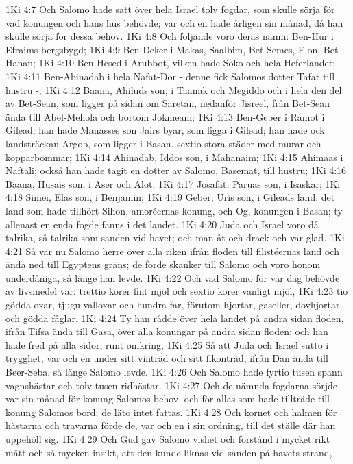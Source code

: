 1Ki 4:7  Och Salomo hade satt över hela Israel tolv fogdar, som skulle sörja för vad konungen och hans hus behövde; var och en hade årligen sin månad, då han skulle sörja för dessa behov.
1Ki 4:8  Och följande voro deras namn: Ben-Hur i Efraims bergsbygd;
1Ki 4:9  Ben-Deker i Makas, Saalbim, Bet-Semes, Elon, Bet-Hanan;
1Ki 4:10  Ben-Hesed i Arubbot, vilken hade Soko och hela Heferlandet;
1Ki 4:11  Ben-Abinadab i hela Nafat-Dor - denne fick Salomos dotter Tafat till hustru -;
1Ki 4:12  Baana, Ahiluds son, i Taanak och Megiddo och i hela den del av Bet-Sean, som ligger på sidan om Saretan, nedanför Jisreel, från Bet-Sean ända till Abel-Mehola och bortom Jokmeam;
1Ki 4:13  Ben-Geber i Ramot i Gilead; han hade Manasses son Jairs byar, som ligga i Gilead; han hade ock landsträckan Argob, som ligger i Basan, sextio stora städer med murar och kopparbommar;
1Ki 4:14  Ahinadab, Iddos son, i Mahanaim;
1Ki 4:15  Ahimaas i Naftali; också han hade tagit en dotter av Salomo, Basemat, till hustru;
1Ki 4:16  Baana, Husais son, i Aser och Alot;
1Ki 4:17  Josafat, Paruas son, i Isaskar;
1Ki 4:18  Simei, Elas son, i Benjamin;
1Ki 4:19  Geber, Uris son, i Gileads land, det land som hade tillhört Sihon, amoréernas konung, och Og, konungen i Basan; ty allenast en enda fogde fanns i det landet.
1Ki 4:20  Juda och Israel voro då talrika, så talrika som sanden vid havet; och man åt och drack och var glad.
1Ki 4:21  Så var nu Salomo herre över alla riken ifrån floden till filistéernas land och ända ned till Egyptens gräns; de förde skänker till Salomo och voro honom underdåniga, så länge han levde.
1Ki 4:22  Och vad Salomo för var dag behövde av livsmedel var: trettio korer fint mjöl och sextio korer vanligt mjöl,
1Ki 4:23  tio gödda oxar, tjugu valloxar och hundra far, förutom hjortar, gaseller, dovhjortar och gödda fåglar.
1Ki 4:24  Ty han rådde över hela landet på andra sidan floden, ifrån Tifsa ända till Gasa, över alla konungar på andra sidan floden; och han hade fred på alla sidor, runt omkring,
1Ki 4:25  Så att Juda och Israel sutto i trygghet, var och en under sitt vinträd och sitt fikonträd, ifrån Dan ända till Beer-Seba, så länge Salomo levde.
1Ki 4:26  Och Salomo hade fyrtio tusen spann vagnshästar och tolv tusen ridhästar.
1Ki 4:27  Och de nämnda fogdarna sörjde var sin månad för konung Salomos behov, och för allas som hade tillträde till konung Salomos bord; de läto intet fattas.
1Ki 4:28  Och kornet och halmen för hästarna och travarna förde de, var och en i sin ordning, till det ställe där han uppehöll sig.
1Ki 4:29  Och Gud gav Salomo vishet och förstånd i mycket rikt mått och så mycken insikt, att den kunde liknas vid sanden på havets strand,
